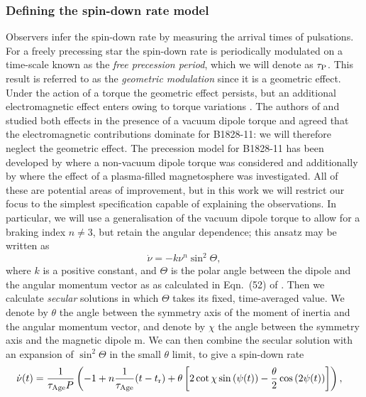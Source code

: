 \documentclass[../full_thesis/full_thesis.tex]{subfiles}
\begin{document}
\subsubsection{Defining the spin-down rate model}

Observers infer the spin-down rate by measuring the arrival times of
pulsations.
For a freely precessing star the spin-down rate is periodically modulated on a
time-scale known as the \emph{free precession period}, which we will denote as
$\tau_{\mathrm{P}}$.  This result is referred to as the \emph{geometric modulation}
\citep{Jones2001} since it is a geometric effect.  Under the action of a torque
the geometric effect persists, but an additional electromagnetic effect enters
owing to torque variations \citep{Cordes1993}. The authors of
\citet{Jones2001} and \citet{Link2001} studied both effects in the
presence of a vacuum dipole torque \citep{Davis1970} and agreed that the
electromagnetic contributions dominate for B1828-11: we will therefore neglect
the geometric effect. The precession model for
B1828-11 has been developed by \citet{Akgun2006} where a non-vacuum
dipole torque was considered and additionally by \citet{Arzamasskiy2015}
where the effect of a plasma-filled magnetosphere was investigated. All of these are
potential areas of improvement, but in this work we will restrict our focus
to the simplest
specification capable of explaining the observations.  In particular, we will
use a generalisation of the vacuum dipole torque to allow for a braking index
$n\ne3$, but retain the angular dependence; this ansatz may be written as
\begin{equation}
\dot{\nu} = -k\nu^{n}\sin^{2}\Theta,
\end{equation}
where $k$ is a positive constant, and $\Theta$ is the
polar angle between the dipole and the angular momentum vector as
as calculated in Eqn.~(52) of \citet{Jones2001}.
Then we calculate \emph{secular} solutions in which $\Theta$ takes its fixed, time-averaged
value. We denote by $\theta$  the angle between the symmetry axis of the
moment of inertia and the angular momentum vector, and denote by $\chi$ the
angle between the symmetry axis and the magnetic dipole m.  We can then combine
the secular solution with an expansion of $\sin^2 \Theta$ in the small
$\theta$ limit, to give a spin-down rate
\begin{align}
\begin{split}
\dot{\nu}(t) = \frac{1}{\tau_{\mathrm{Age}} P}&\left(-1 + n\frac{1}{\tau_{\mathrm{Age}}} (t-t_{\textrm{r}})
 + \theta \left[
2\cot\chi\sin\left(\psi(t)\right) - \frac{\theta}{2}\cos\left(2\psi(t)\right)
\right]\right),
\end{split}
\label{eqn: precession nudot degen}
\end{align}
\end{document}
